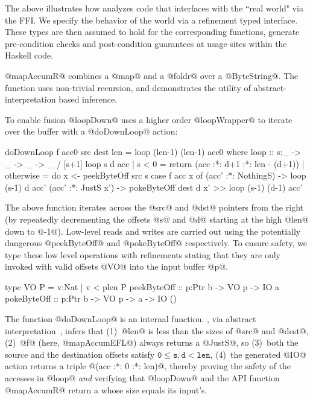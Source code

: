 The above illustrates how \toolname analyzes code that interfaces 
with the ``real world" via the \C FFI. We specify the behavior 
of the world via a refinement typed interface. These types are then assumed
to hold for the corresponding functions, \ie generate pre-condition checks
and post-condition guarantees at usage sites within the Haskell code.


@mapAccumR@ combines a @map@ and a @foldr@ over a @ByteString@. 
The function uses non-trivial recursion, and demonstrates 
the utility of abstract-interpretation based inference. 
%
To enable fusion \cite{streamfusion} 
@loopDown@ uses a higher order @loopWrapper@ 
to iterate over the buffer with a @doDownLoop@ action:
%
\begin{code}
  doDownLoop f acc0 src dest len = loop (len-1) (len-1) acc0
    where
     loop :: s:_ -> _ -> _ -> _ / [s+1]
     loop s d acc 
       | s < 0 
       = return (acc :*: d+1 :*: len - (d+1))
       | otherwise       
       = do x <- peekByteOff src s
            case f acc x of
              (acc' :*: NothingS) -> 
                   loop (s-1) d acc'
              (acc' :*: JustS x') -> 
                   pokeByteOff dest d x'
                >> loop (s-1) (d-1) acc'
\end{code}

The above function iterates across the @src@ and @dst@ 
pointers from the right (by repeatedly decrementing the 
offsets @s@ and @d@ starting at the high @len@ down to @-1@). 
Low-level reads and writes are carried out using the 
potentially dangerous @peekByteOff@ and @pokeByteOff@ 
respectively. To ensure safety, we type these low level 
operations with refinements stating that they are only 
invoked with valid offsets @VO@ into the input buffer @p@.

\begin{code}
  type VO P    = {v:Nat | v < plen P}
  peekByteOff :: p:Ptr b -> VO p -> IO a
  pokeByteOff :: p:Ptr b -> VO p -> a -> IO ()
\end{code}

The function @doDownLoop@ is an internal function.
\toolname, via abstract interpretation~\cite{LiquidPLDI08}, 
infers that
%
(1)~@len@ is less than the sizes of @src@ and @dest@,
(2)~@f@ (here, @mapAccumEFL@) always returns a @JustS@, so
(3)~both the source and the destination offsets satisfy $$,
(4)~the generated @IO@ action returns a triple @(acc :*: 0 :*: len)@,
%
thereby proving the safety of the accesses in @loop@ \emph{and}
verifying that @loopDown@ and the API function @mapAccumR@ 
return a \bytestring whose size equals its input's.
 
